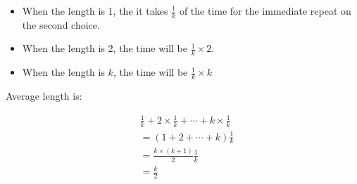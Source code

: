 \documentclass[../../main.tex]{subfiles}
\begin{document}
\begin{itemize}
  \item When the length is 1, the it takes $\frac{1}{k}$ of the time
        for the immediate repeat on the second choice.
  \item When the length is 2, the time will be $\frac{1}{k} \times 2$.
  \item When the length is $k$, the time will be $\frac{1}{k} \times k$
\end{itemize}

Average length is:

\begin{align*}
  &\frac{1}{k} + 2 \times \frac{1}{k} + \cdots + k \times \frac{1}{k} \\
  &= (1 + 2 + \cdots + k) \frac{1}{k} \\
  &= \frac{k \times (k + 1)}{2} \frac{1}{k} \\
  &= \frac{k}{2}
\end{align*}
\end{document}
